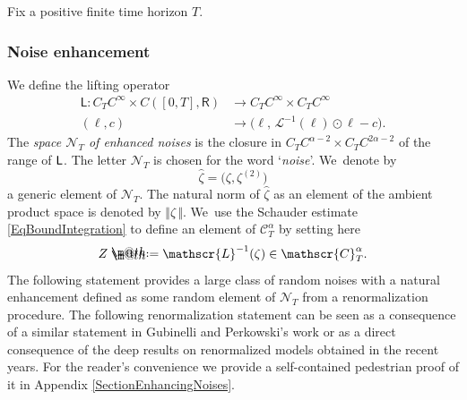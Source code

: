 \documentclass[10pt]{amsart}
\makeatletter
\theoremstyle{definition}
\newcommand\bbR{\mathbf{\mathsf{R}}}
\newcommand{\mcN}{\mathcal{N}}
\newcommand*{\defeq}{\mathrel{\rlap{%
\raisebox{0.3ex}{$\m@th\cdot$}}%
\raisebox{-0.3ex}{$\m@th\cdot$}}%
=}
\newcommand{\scrL}{\mathscr{L}}
\makeatother
\begin{document}
Fix a positive finite time horizon $T$.

\subsubsection{Noise enhancement} We define the lifting operator
\begin{equation*} \begin{split}
\mathsf{L} : C_TC^\infty\times C([0,T],\bbR) &\to C_TC^\infty\times C_TC^\infty \\
(\ell, c) &\to \bigl(\ell, \, \scrL^{-1}(\ell)\odot\ell - c\bigr).
\end{split} \end{equation*}
The \emph{space ${{\boldsymbol{\mcN}}_T}$ of enhanced noises} is the closure in $C_TC^{\alpha-2}\times C_TC^{2\alpha-2}$ of the range of $\sf L$. The letter ${{\boldsymbol{\mcN}}_T}$ is chosen for the word `\emph{noise}'. We~denote by
\[
\widehat\zeta = \bigl(\zeta,\zeta^{(2)}\bigr)
\]
a generic element of ${{\boldsymbol{\mcN}}_T}$. The natural norm of $\widehat\zeta$ as an element of the ambient product space is denoted by $\Vert\widehat\zeta\,\Vert$. We~use the Schauder estimate \eqref{EqBoundIntegration} to define an element of $\mathscr{C}^\alpha_T$ by setting here
\[
Z \defeq \scrL^{-1}(\zeta) \in \mathscr{C}^\alpha_T.
\]
The following statement provides a large class of random noises with a natural enhancement defined as some random element of ${{\boldsymbol{\mcN}}_T}$ from a renormalization procedure. The following renormalization statement can be seen as a consequence of a similar statement in Gubinelli and Perkowski's work \cite{KPZreloaded} or as a direct consequence of the deep results on renormalized models obtained in the recent years. For the reader's convenience we provide a self-contained pedestrian proof of it in Appendix \ref{SectionEnhancingNoises}.
\end{document}
